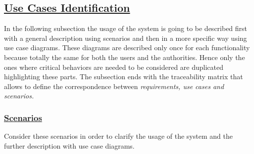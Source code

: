 \subsection[Use Cases Identification]{\hyperlink{toc}{Use Cases Identification}}
	In the following subsection the usage of the system is going to be described first with a general description using scenarios and then in a more specific way using use case diagrams. These diagrams are described only once for each functionality because totally the same for both the users and the authorities. Hence only the ones where critical behaviors are needed to be considered are duplicated highlighting these parts. The subsection ends with the traceability matrix that allows to define the correspondence between \emph{requirements, use cases and scenarios.}
	
	\subsubsection[Scenarios]{\hyperlink{toc}{Scenarios}}
		Consider these scenarios in order to clarify the usage of the system and the further description with use case diagrams.
		
